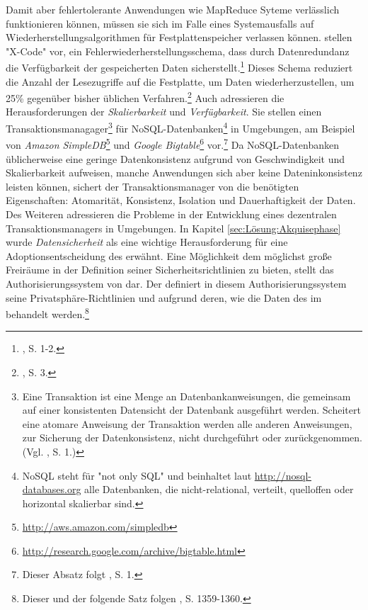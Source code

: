 \newline
Damit aber fehlertolerante Anwendungen wie MapReduce Syteme verlässlich funktionieren können, müssen sie sich im Falle eines Systemausfalls auf Wiederherstellungsalgorithmen für Festplattenspeicher verlassen können.
\cite{Xu.2013} stellen "X-Code" vor, ein Fehlerwiederherstellungsschema, dass durch Datenredundanz die Verfügbarkeit der gespeicherten Daten sicherstellt.\footnote{\cite{Xu.2013}, S. 1-2.} 
Dieses Schema reduziert die Anzahl der Lesezugriffe auf die Festplatte, um Daten wiederherzustellen, um 25\% gegenüber bisher üblichen Verfahren.\footnote{\cite{Xu.2013}, S. 3.}
\newline
Auch \cite{Wei.2012} adressieren die Herausforderungen der \emph{Skalierbarkeit} und \emph{Verfügbarkeit}. Sie stellen einen Transaktionsmanagager\footnote{Eine Transaktion ist eine Menge an Datenbankanweisungen, die gemeinsam auf einer konsistenten Datensicht der Datenbank ausgeführt werden. 
Scheitert eine atomare Anweisung der Transaktion werden alle anderen Anweisungen, zur Sicherung der Datenkonsistenz, nicht durchgeführt oder zurückgenommen. (Vgl. \cite{Wei.2012}, S. 1.)} für NoSQL-Datenbanken\footnote{NoSQL steht für "not only SQL" und beinhaltet laut \url{http://nosql-databases.org} alle Datenbanken, die nicht-relational, verteilt, quelloffen oder horizontal skalierbar sind.} in \CC Umgebungen, am Beispiel von \emph{Amazon SimpleDB}\footnote{\url{http://aws.amazon.com/simpledb}} und \emph{Google Bigtable}\footnote{\url{http://research.google.com/archive/bigtable.html}} vor.\footnote{Dieser Absatz folgt \cite{Wei.2012}, S. 1.}
Da NoSQL-Datenbanken üblicherweise eine geringe Datenkonsistenz aufgrund von Geschwindigkeit und Skalierbarkeit aufweisen, manche Anwendungen sich aber keine Dateninkonsistenz leisten können, sichert der Transaktionsmanager von \cite{Wei.2012} die benötigten Eigenschaften: Atomarität, Konsistenz, Isolation und Dauerhaftigkeit der Daten.
Des Weiteren adressieren \cite{Wei.2012} die Probleme in der Entwicklung eines dezentralen Transaktionsmanagers in \CC Umgebungen.
\newline
In Kapitel \ref{sec:Lösung:Akquisephase} wurde \emph{Datensicherheit} als eine wichtige Herausforderung für eine Adoptionsentscheidung des \CSUs erwähnt. Eine Möglichkeit dem \CSU möglichst große Freiräume in der Definition seiner Sicherheitsrichtlinien zu bieten, stellt das Authorisierungssystem von \cite{Chadwick.2012} dar. Der \CSU definiert in diesem Authorisierungssystem seine Privatsphäre-Richtlinien und aufgrund deren, wie die Daten des \CSUs im \CS behandelt werden.\footnote{Dieser und der folgende Satz folgen \cite{Chadwick.2012}, S. 1359-1360.}
